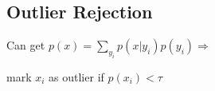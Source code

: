 \subsection{Outlier Rejection}

Can get $p(x) = \sum_{y_i} p(x|y_i)p(y_i) \Rightarrow$ 

mark $x_i$ as outlier if $p(x_i) < \tau$